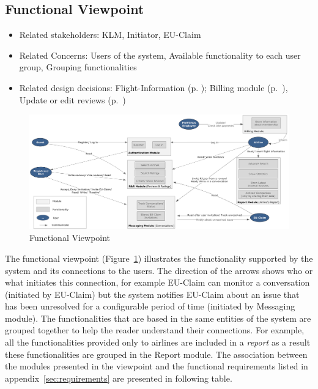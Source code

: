 % 

\subsection{Functional Viewpoint}

\begin{itemize}
\item Related stakeholders: KLM, Initiator, EU-Claim
\item Related Concerns: Users of the system, Available functionality to each user group, Grouping functionalities
\item Related design decisions: Flight-Information (p. \pageref{dd:flight-inf}); Billing module (p.~\pageref{sec:minor-dd}), Update or edit reviews (p.~\pageref{sec:minor-dd})
\end{itemize}

\newpage
\begin{landscape}
\begin{figure}
\includegraphics[width=600px]{Functional_Viewpoint.jpg}
\caption{Functional Viewpoint}
\label{fig:functional}
\end{figure}
\end{landscape}

The functional viewpoint (Figure~\ref{fig:functional}) illustrates the functionality supported by the system and its connections to the users. The direction of the arrows shows who or what initiates this connection, for example EU-Claim can monitor a conversation (initiated by EU-Claim) but  the system notifies EU-Claim about an issue that has been unresolved for a configurable period of time (initiated by Messaging module). The functionalities that are based in the same entities of the system are grouped together to help the reader understand their connections. For example, all the functionalities  provided only to airlines are included in a {\em report} as a result these functionalities are grouped in the Report module. The association between the modules presented in the viewpoint and the functional requirements listed in appendix~\ref{sec:requirements} are presented in following table.

